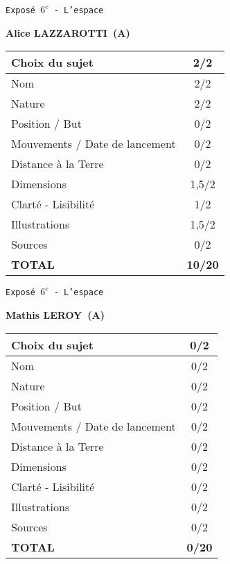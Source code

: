 	\vspace*{1cm}
	
	\newpage
	\LARGE{\texttt{Expos\'e $6^e$ - L'espace}}
	\vspace*{1cm}

	\textbf{Alice LAZZAROTTI\ (A)}

	\vspace*{1.5cm}
	\begin{tabular}{|l|c|}
		\hline
		Choix du sujet & 2/2 \\
		\hline
		Nom & 2/2 \\
		\hline
		Nature & 2/2 \\
		\hline
		Position / But & 0/2 \\
		\hline
		Mouvements / Date de lancement & 0/2 \\
		\hline
		Distance \`a la Terre & 0/2 \\
		\hline
		Dimensions & 1,5/2 \\
		\hline
		Clart\'e - Lisibilit\'e & 1/2 \\
		\hline
		Illustrations & 1,5/2 \\
		\hline
		Sources & 0/2 \\
		\hline
		\textbf{TOTAL}  & \textbf{10/20} \\
		\hline
	\end{tabular}

	\vspace*{1cm}
	
	\newpage
	\LARGE{\texttt{Expos\'e $6^e$ - L'espace}}
	\vspace*{1cm}

	\textbf{Mathis LEROY\ (A)}

	\vspace*{1.5cm}
	\begin{tabular}{|l|c|}
		\hline
		Choix du sujet & 0/2 \\
		\hline
		Nom & 0/2 \\
		\hline
		Nature & 0/2 \\
		\hline
		Position / But & 0/2 \\
		\hline
		Mouvements / Date de lancement & 0/2 \\
		\hline
		Distance \`a la Terre & 0/2 \\
		\hline
		Dimensions & 0/2 \\
		\hline
		Clart\'e - Lisibilit\'e & 0/2 \\
		\hline
		Illustrations & 0/2 \\
		\hline
		Sources & 0/2 \\
		\hline
		\textbf{TOTAL}  & \textbf{0/20} \\
		\hline
	\end{tabular}

